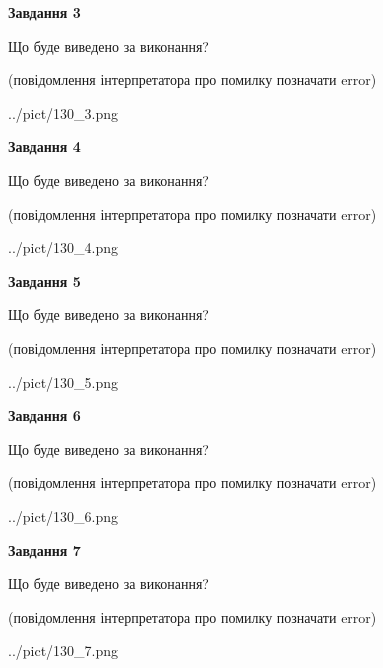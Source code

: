 \documentclass[12pt, ukrainian]{article}
\begin{document}
{\begin {large}
{\begin {center}\textbf{Завдання 3}\end {center}}\par
Що буде виведено за виконання?\par
 (повідомлення інтерпретатора про помилку позначати error)\par
\begin{center}
	{../pict/130_3.png}
\end{center}
\newpage

{\begin {center}\textbf{Завдання 4}\end {center}}\par
Що буде виведено за виконання?\par
 (повідомлення інтерпретатора про помилку позначати error)\par
\begin{center}
	{../pict/130_4.png}
\end{center}
\newpage

{\begin {center}\textbf{Завдання 5}\end {center}}\par
Що буде виведено за виконання?\par
 (повідомлення інтерпретатора про помилку позначати error)\par
\begin{center}
	{../pict/130_5.png}
\end{center}
\newpage

{\begin {center}\textbf{Завдання 6}\end {center}}\par
Що буде виведено за виконання?\par
 (повідомлення інтерпретатора про помилку позначати error)\par
\begin{center}
	{../pict/130_6.png}
\end{center}
\newpage

{\begin {center}\textbf{Завдання 7}\end {center}}\par
Що буде виведено за виконання?\par
 (повідомлення інтерпретатора про помилку позначати error)\par
\begin{center}
	{../pict/130_7.png}
\end{center}
\newpage


\end{large}}
\end{document}
